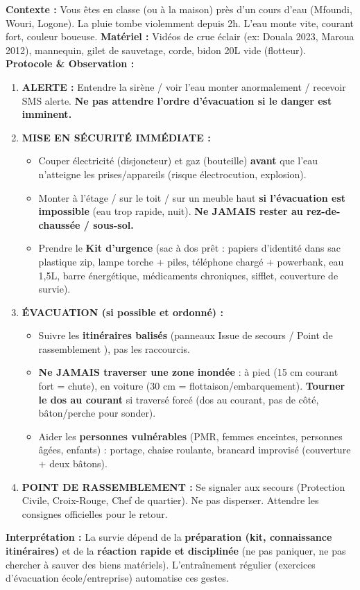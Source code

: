 \documentclass[11pt]{article}
\begin{document}
\begin{experience}
\textbf{Contexte :} Vous êtes en classe (ou à la maison) près d'un cours d'eau (Mfoundi, Wouri, Logone). La pluie tombe violemment depuis 2h. L'eau monte vite, courant fort, couleur boueuse.
\textbf{Matériel :} Vidéos de crue éclair (ex: Douala 2023, Maroua 2012), mannequin, gilet de sauvetage, corde, bidon 20L vide (flotteur).
\textbf{Protocole \& Observation :}
\begin{enumerate}
    \item \textbf{ALERTE :} Entendre la sirène / voir l'eau monter anormalement / recevoir SMS alerte. \textbf{Ne pas attendre l'ordre d'évacuation si le danger est imminent.}
    \item \textbf{MISE EN SÉCURITÉ IMMÉDIATE :}
        \begin{itemize}
            \item Couper électricité (disjoncteur) et gaz (bouteille) \textbf{avant} que l'eau n'atteigne les prises/appareils (risque électrocution, explosion).
            \item Monter à l'étage / sur le toit / sur un meuble haut \textbf{si l'évacuation est impossible} (eau trop rapide, nuit). \textbf{Ne JAMAIS rester au rez-de-chaussée / sous-sol.}
            \item Prendre le \textbf{Kit d'urgence} (sac à dos prêt : papiers d'identité dans sac plastique zip, lampe torche + piles, téléphone chargé + powerbank, eau 1,5L, barre énergétique, médicaments chroniques, sifflet, couverture de survie).
        \end{itemize}
    \item \textbf{ÉVACUATION (si possible et ordonné) :}
        \begin{itemize}
            \item Suivre les \textbf{itinéraires balisés} (panneaux \og Issue de secours \fg / \og Point de rassemblement \fg), pas les raccourcis.
            \item \textbf{Ne JAMAIS traverser une zone inondée} : à pied (15 cm courant fort = chute), en voiture (30 cm = flottaison/embarquement). \textbf{Tourner le dos au courant} si traversé forcé (dos au courant, pas de côté, bâton/perche pour sonder).
            \item Aider les \textbf{personnes vulnérables} (PMR, femmes enceintes, personnes âgées, enfants) : portage, chaise roulante, brancard improvisé (couverture + deux bâtons).
        \end{itemize}
    \item \textbf{POINT DE RASSEMBLEMENT :} Se signaler aux secours (Protection Civile, Croix-Rouge, Chef de quartier). Ne pas disperser. Attendre les consignes officielles pour le retour.
\end{enumerate}
\textbf{Interprétation :} La survie dépend de la \textbf{préparation (kit, connaissance itinéraires)} et de la \textbf{réaction rapide et disciplinée} (ne pas paniquer, ne pas chercher à sauver des biens matériels). L'entraînement régulier (exercices d'évacuation école/entreprise) automatise ces gestes.
\end{experience}
\end{document}
